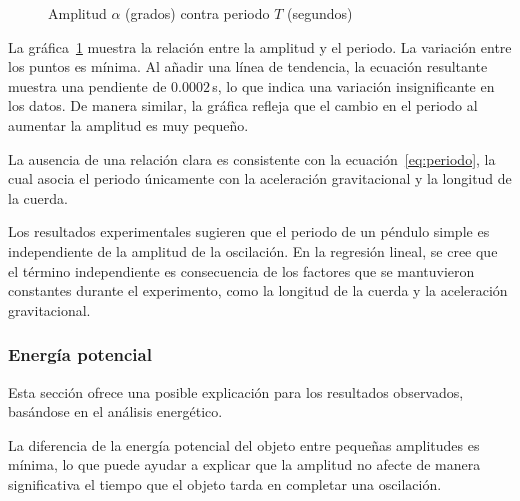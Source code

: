 \documentclass[twocolumn]{report}
\numberwithin{table}{section}
\begin{document}
\begin{figure}[ht]
  \centering
  \caption{Amplitud $\alpha$ (grados) contra periodo $T$
  (segundos)}\label{fig:amplitud_periodo}
\end{figure}

La gráfica~\ref{fig:amplitud_periodo} muestra la relación entre la
amplitud y el periodo. La variación entre los puntos es mínima. Al
añadir una línea de tendencia, la ecuación resultante muestra una
pendiente de $0.0002$\,s, lo que indica una variación insignificante
en los datos. De manera similar, la gráfica refleja que el cambio en
el periodo al aumentar la amplitud es muy pequeño.

La ausencia de una relación clara es consistente con la
ecuación~\eqref{eq:periodo}, la cual asocia el periodo únicamente con la
aceleración gravitacional y la longitud de la cuerda.

Los resultados experimentales sugieren que el periodo de un péndulo simple es
independiente de la amplitud de la oscilación. En la regresión lineal, se cree
que el término independiente es consecuencia de los factores que se mantuvieron
constantes durante el experimento, como la longitud de la cuerda y la
aceleración gravitacional.

\subsubsection{Energía potencial}

Esta sección ofrece una posible explicación para los resultados
observados, basándose en el análisis energético.

La diferencia de la energía potencial del objeto entre pequeñas amplitudes
es mínima, lo que puede ayudar a explicar que la amplitud no afecte de manera
significativa el tiempo que el objeto tarda en completar una oscilación.
\end{document}
